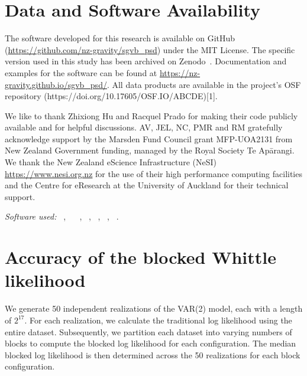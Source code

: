 \documentclass[%
 reprint,
 amsmath,amssymb,
 aps,
 nofootinbib,
]{revtex4-2}
\begin{document}
\section*{Data and Software Availability}
The software developed for this research is available on GitHub (\url{https://github.com/nz-gravity/sgvb_psd}) under the MIT License. 
The specific version used in this study has been archived on Zenodo~\cite{}. 
Documentation and examples for the software can be found at \url{https://nz-gravity.github.io/sgvb_psd/}.
All data products are available in the project's OSF repository (https://doi.org/10.17605/OSF.IO/ABCDE)[1].




\begin{acknowledgments}
We like to thank Zhixiong Hu and Racquel Prado for making their code publicly available and for helpful discussions. AV,  JEL, NC, PMR and RM gratefully acknowledge support  by the Marsden Fund Council grant MFP-UOA2131 from New Zealand Government funding, managed by the Royal Society Te Apārangi. We thank the New Zealand eScience Infrastructure
(NeSI) \url{https://www.nesi.org.nz} for the use of their high performance computing facilities and
the Centre for eResearch at the University of Auckland for their technical
support.
\end{acknowledgments}


\vspace{3mm}

\noindent\textit{Software used:}
\python~\cite{pythonForScientificComputing,pythonForScientists},
\tensorflowProb~\cite{tensorflow, tensorflowProb}
\numpy~\cite{numpy},
\scipy~\cite{SciPy},
\pandas~\cite{pandas},
\matplotlib~\cite{matplotlib},
\jupyterbook~\cite{jupyter_book, sphinx, jupyter}.





\appendix  


\section{Accuracy of the blocked  Whittle likelihood}
\label{appdx:blocked_lnl}

We generate 50 independent realizations of the VAR(2) model, each with a length of \(2^{17}\). 
For each realization, we calculate the traditional log likelihood using the entire dataset. 
Subsequently, we partition each dataset into varying numbers of blocks to compute the blocked log likelihood for each configuration. 
The median blocked log likelihood is then determined across the 50 realizations for each block configuration.
\end{document}
